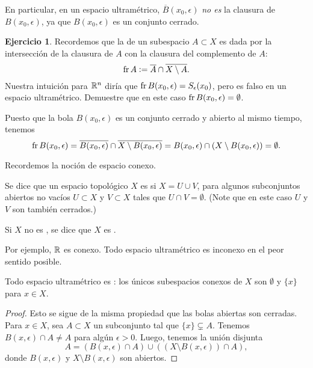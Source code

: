 \documentclass{article}
\numberwithin{equation}{section}
\theoremstyle{definition}
\newtheorem{ejerc}{Ejercicio}
\begin{document}
En particular, en un espacio ultramétrico, $\overline{B} (x_0,\epsilon)$
\emph{no es} la clausura de $B (x_0,\epsilon)$, ya que $B (x_0,\epsilon)$
es un conjunto cerrado.

\begin{ejerc}
  Recordemos que la  de un subespacio $A \subset X$ es dada por
  la intersección de la clausura de $A$ con la clausura del complemento de $A$:
  $$\operatorname{fr} A \mathrel{\mathop:}= \overline{A} \cap \overline{X\setminus A}.$$
  Nuestra intuición para $\mathbb{R}^n$ diría que
  $\operatorname{fr} B (x_0,\epsilon) = S_\epsilon (x_0)$, pero es falso en un espacio
  ultramétrico. Demuestre que en este caso $\operatorname{fr} B (x_0,\epsilon) = \emptyset$.

  \ifdefined\solutions\begin{solucion}
    Puesto que la bola $B (x_0,\epsilon)$ es un conjunto cerrado y abierto
    al mismo tiempo, tenemos
    \[ \operatorname{fr} B (x_0,\epsilon) =
       \overline{B (x_0,\epsilon)} \cap \overline{X\setminus B (x_0,\epsilon)} =
       B (x_0,\epsilon) \cap (X\setminus B (x_0,\epsilon)) = \emptyset. \]
  \end{solucion}\fi
\end{ejerc}

Recordemos la noción de espacio conexo.

\begin{definicion}
  Se dice que un espacio topológico $X$ es  si $X = U\cup V$,
  para algunos subconjuntos abiertos no vacíos $U \subset X$ y $V \subset X$
  tales que $U\cap V = \emptyset$. (Note que en este caso $U$ y $V$ son también
  cerrados.)

  Si $X$ no es , se dice que $X$ es .
\end{definicion}

Por ejemplo, $\mathbb{R}$ es conexo. Todo espacio ultramétrico es inconexo en el peor
sentido posible.

\begin{observacion}
  Todo espacio ultramétrico es : los únicos
  subespacios conexos de $X$ son $\emptyset$ y $\{ x \}$ para $x\in X$.

  \begin{proof}
    Esto se sigue de la misma propiedad que las bolas abiertas son cerradas.
    Para $x \in X$, sea $A \subset X$ un subconjunto tal que
    $\{ x \} \subsetneq A$. Tenemos $B (x,\epsilon) \cap A \ne A$ para algún
    $\epsilon > 0$. Luego, tenemos la unión disjunta
    $$A = (B (x,\epsilon) \cap A) \cup ((X \setminus B (x,\epsilon)) \cap A),$$
    donde $B (x,\epsilon)$ y $X \setminus B (x,\epsilon)$ son abiertos.
  \end{proof}
\end{observacion}
\end{document}
